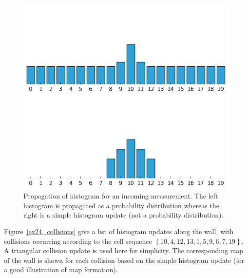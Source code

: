 \begin{exmp}
\begin{figure}
\centering
\begin{minipage}{0.45\textwidth}
\centering
\includegraphics[scale=0.4]{./images/ex24/ex24coll10.png}
\end{minipage}
\begin{minipage}{0.45\textwidth}
\centering
\includegraphics[scale=0.4]{./images/ex24/ex24coll10_1.png}
\end{minipage}
\caption[Histogram propagation of measurement information]{Propagation of histogram for an incoming measurement. The left histogram is propagated as a probability distribution whereas the right is a simple histogram update (not a probability distribution).}
\label{ex24coll_10}
\end{figure}

Figure~\ref{ex24_collisions} give a list of histogram updates along the wall, with collisions occurring according to the cell sequence $\left\lbrace 10,4,12,13,1,5,9,6,7,19\right\rbrace$. A triangular collision update is used here for simplicity. The corresponding map of the wall is shown for each collision based on the simple histogram update (for a good illustration of map formation). 


\end{exmp}
